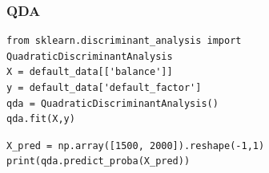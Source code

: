 \begin{frame}[fragile]\frametitle{QDA }
\tiny
\begin{lstlisting}
from sklearn.discriminant_analysis import QuadraticDiscriminantAnalysis
X = default_data[['balance']]
y = default_data['default_factor']
qda = QuadraticDiscriminantAnalysis()
qda.fit(X,y)
\end{lstlisting}
\pause
\begin{lstlisting}
X_pred = np.array([1500, 2000]).reshape(-1,1)
print(qda.predict_proba(X_pred))
\end{lstlisting}

\end{frame}




%
%
%
%



